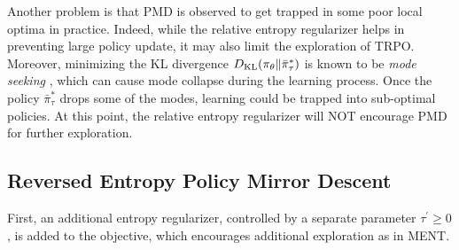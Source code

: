 Another problem is that PMD is observed to get trapped in some poor local optima in practice. 
Indeed, while the relative entropy regularizer helps in preventing large policy update, it may also limit the exploration of TRPO.
Moreover, minimizing the KL divergence $D_{\mathrm{KL}}(\pi_\theta \| \bar{\pi}_\tau^*) $ is known to be \emph{mode seeking} \citep{kevin2012machine}, which can cause mode collapse during the learning process. Once the policy $\bar{\pi}_\tau^*$ drops some of the modes, learning could be trapped into sub-optimal policies.
At this point, the relative entropy regularizer will NOT encourage PMD for further exploration.



\subsection{Reversed Entropy Policy Mirror Descent}
\label{subsec:repmd}
First, an additional entropy regularizer, controlled by a separate parameter $\tau^{\prime}\geq 0$, is added to the objective, which encourages additional exploration as in MENT.

